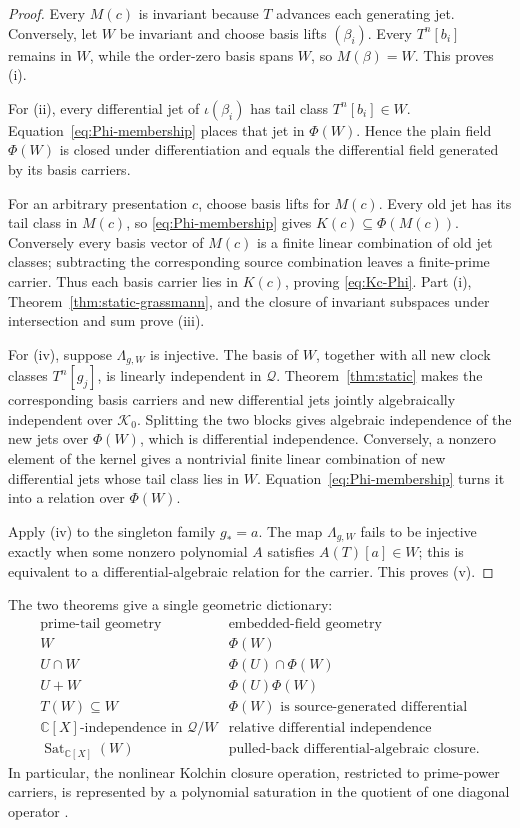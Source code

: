 \documentclass[11pt]{article}
\theoremstyle{definition}
\theoremstyle{remark}
\newcommand{\C}{\mathbb C}
\newcommand{\cK}{\mathcal K}
\newcommand{\cQ}{\mathcal Q}
\newcommand{\Sat}{\operatorname{Sat}}
\begin{document}
\begin{proof}
Every \(M(c)\) is invariant because \(T\) advances each generating jet.  Conversely, let \(W\)
be invariant and choose basis lifts \((\beta_i)\).  Every \(T^n[b_i]\) remains in \(W\), while
the order-zero basis spans \(W\), so \(M(\beta)=W\).  This proves (i).

For (ii), every differential jet of \(\iota(\beta_i)\) has tail class \(T^n[b_i]\in W\).
Equation~\eqref{eq:Phi-membership} places that jet in \(\Phi(W)\).  Hence the plain field
\(\Phi(W)\) is closed under differentiation and equals the differential field generated by its
basis carriers.

For an arbitrary presentation \(c\), choose basis lifts for \(M(c)\).  Every old jet has its
tail class in \(M(c)\), so \eqref{eq:Phi-membership} gives \(K(c)\subseteq\Phi(M(c))\).
Conversely every basis vector of \(M(c)\) is a finite linear combination of old jet classes;
subtracting the corresponding source combination leaves a finite-prime carrier.  Thus each basis
carrier lies in \(K(c)\), proving \eqref{eq:Kc-Phi}.  Part (i), Theorem~\ref{thm:static-grassmann},
and the closure of invariant subspaces under intersection and sum prove (iii).

For (iv), suppose \(\Lambda_{g,W}\) is injective.  The basis of \(W\), together with all new
clock classes \(T^n[g_j]\), is linearly independent in \(\cQ\).  Theorem~\ref{thm:static}
makes the corresponding basis carriers and new differential jets jointly algebraically
independent over \(\cK_0\).  Splitting the two blocks gives algebraic independence of the new
jets over \(\Phi(W)\), which is differential independence.  Conversely, a nonzero element of
the kernel gives a nontrivial finite linear combination of new differential jets whose tail class
lies in \(W\).  Equation~\eqref{eq:Phi-membership} turns it into a relation over \(\Phi(W)\).

Apply (iv) to the singleton family \(g_*=a\).  The map \(\Lambda_{g,W}\) fails to be injective
exactly when some nonzero polynomial \(A\) satisfies \(A(T)[a]\in W\); this is equivalent to a
differential-algebraic relation for the carrier.  This proves (v).
\end{proof}

\medskip
\noindent
The two theorems give a single geometric dictionary:
\[
\begin{array}{c|c}
\text{prime-tail geometry} & \text{embedded-field geometry}\\ \hline
W & \Phi(W)\\
U\cap W & \Phi(U)\cap\Phi(W)\\
U+W & \Phi(U)\Phi(W)\\
T(W)\subseteq W & \Phi(W)\text{ is source-generated differential}\\
\C[X]\text{-independence in }\cQ/W & \text{relative differential independence}\\
\Sat_{\C[X]}(W) & \text{pulled-back differential-algebraic closure.}
\end{array}
\]
In particular, the nonlinear Kolchin closure operation, restricted to prime-power carriers, is
represented by a polynomial saturation in the quotient of one diagonal operator
\cite{Kolchin}.
\end{document}
